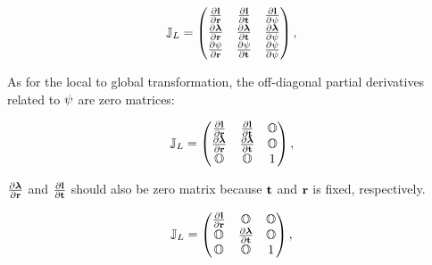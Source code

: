 \documentclass[12pt,a4paper]{scrarticle}
\begin{document}
\begin{equation}\label{eq:jacobi3}
    \mathbb{J}_{L} = 
    \begin{pmatrix}
     \frac{\partial{\mathbf{l}}}{\partial{\mathbf{r}}} & 
     \frac{\partial{\mathbf{l}}}{\partial{\mathbf{t}}}&  \frac{\partial{\mathbf{l}}}{\partial{\psi}} \\
     \frac{\partial{\boldsymbol{\lambda}}}{\partial{\mathbf{r}}} & 
     \frac{\partial{\boldsymbol{\lambda}}}{\partial{\mathbf{t}}}&  \frac{\partial{\boldsymbol{\lambda}}}{\partial{\psi}} \\
     \frac{\partial{\psi}}{\partial{\mathbf{r}}} & 
     \frac{\partial{\psi}}{\partial{\mathbf{t}}}&  \frac{\partial{\psi}}{\partial{\psi}}
    \end{pmatrix},
\end{equation}

As for the local to global transformation, the off-diagonal partial derivatives related to $\psi$ are zero matrices:

\begin{equation}\label{eq:jacobi4}
    \mathbb{J}_{L} = 
    \begin{pmatrix}
     \frac{\partial{\mathbf{l}}}{\partial{\mathbf{r}}} & 
     \frac{\partial{\mathbf{l}}}{\partial{\mathbf{t}}}&  \mathbb{O} \\
     \frac{\partial{\boldsymbol{\lambda}}}{\partial{\mathbf{r}}} & 
     \frac{\partial{\boldsymbol{\lambda}}}{\partial{\mathbf{t}}}&  \mathbb{O} \\
     \mathbb{O} & 
     \mathbb{O} &  1
    \end{pmatrix},
\end{equation}

$\frac{\partial{\boldsymbol{\lambda}}}{\partial{\mathbf{r}}}$ and $\frac{\partial{\mathbf{l}}}{\partial{\mathbf{t}}}$ should also be zero matrix because $\mathbf{t}$ and $\mathbf{r}$ is fixed, respectively. 

\begin{equation}\label{eq:jacobi5}
    \mathbb{J}_{L} = 
    \begin{pmatrix}
     \frac{\partial{\mathbf{l}}}{\partial{\mathbf{r}}} & \mathbb{O} &  \mathbb{O} \\
     \mathbb{O} & \frac{\partial{\boldsymbol{\lambda}}}{\partial{\mathbf{t}}} &  \mathbb{O} \\
     \mathbb{O} & \mathbb{O} & 1
    \end{pmatrix},
\end{equation}
\end{document}

